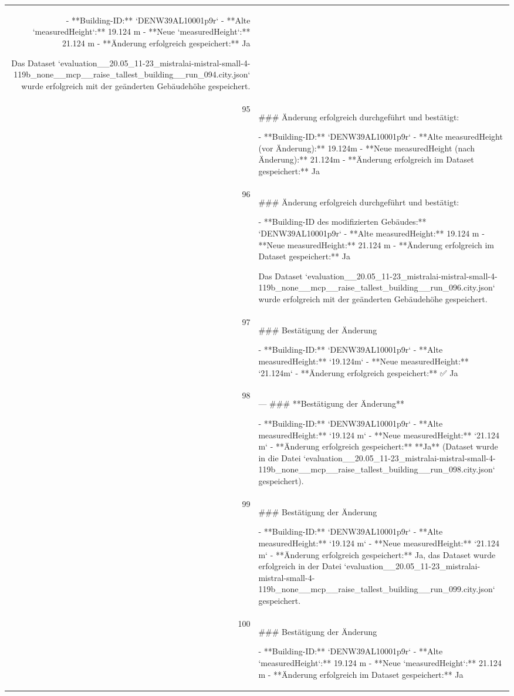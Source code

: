 \documentclass[a4paper,11pt]{article}
\begin{document}
\begin{table}[ht]
\begin{tabular}{r p{12cm}}
- **Building-ID:** `DENW39AL10001p9r`
- **Alte `measuredHeight`:** 19.124 m
- **Neue `measuredHeight`:** 21.124 m
- **Änderung erfolgreich gespeichert:** Ja

Das Dataset `evaluation\_\_20.05\_11-23\_mistralai-mistral-small-4-119b\_none\_\_mcp\_\_raise\_tallest\_building\_\_run\_094.city.json` wurde erfolgreich mit der geänderten Gebäudehöhe gespeichert. \\
95 & \#\#\# Änderung erfolgreich durchgeführt und bestätigt:

- **Building-ID:** `DENW39AL10001p9r`
- **Alte measuredHeight (vor Änderung):** 19.124m
- **Neue measuredHeight (nach Änderung):** 21.124m
- **Änderung erfolgreich im Dataset gespeichert:** Ja \\
96 & \#\#\# Änderung erfolgreich durchgeführt und bestätigt:

- **Building-ID des modifizierten Gebäudes:** `DENW39AL10001p9r`
- **Alte measuredHeight:** 19.124 m
- **Neue measuredHeight:** 21.124 m
- **Änderung erfolgreich im Dataset gespeichert:** Ja

Das Dataset `evaluation\_\_20.05\_11-23\_mistralai-mistral-small-4-119b\_none\_\_mcp\_\_raise\_tallest\_building\_\_run\_096.city.json` wurde erfolgreich mit der geänderten Gebäudehöhe gespeichert. \\
97 & \#\#\# Bestätigung der Änderung

- **Building-ID:** `DENW39AL10001p9r`
- **Alte measuredHeight:** `19.124m`
- **Neue measuredHeight:** `21.124m`
- **Änderung erfolgreich gespeichert:** ✅ Ja \\
98 & ---
\#\#\# **Bestätigung der Änderung**

- **Building-ID:** `DENW39AL10001p9r`
- **Alte measuredHeight:** `19.124 m`
- **Neue measuredHeight:** `21.124 m`
- **Änderung erfolgreich gespeichert:** **Ja**
  (Dataset wurde in die Datei `evaluation\_\_20.05\_11-23\_mistralai-mistral-small-4-119b\_none\_\_mcp\_\_raise\_tallest\_building\_\_run\_098.city.json` gespeichert). \\
99 & \#\#\# Bestätigung der Änderung

- **Building-ID:** `DENW39AL10001p9r`
- **Alte measuredHeight:** `19.124 m`
- **Neue measuredHeight:** `21.124 m`
- **Änderung erfolgreich gespeichert:** Ja, das Dataset wurde erfolgreich in der Datei `evaluation\_\_20.05\_11-23\_mistralai-mistral-small-4-119b\_none\_\_mcp\_\_raise\_tallest\_building\_\_run\_099.city.json` gespeichert. \\
100 & \#\#\# Bestätigung der Änderung

- **Building-ID:** `DENW39AL10001p9r`
- **Alte `measuredHeight`:** 19.124 m
- **Neue `measuredHeight`:** 21.124 m
- **Änderung erfolgreich im Dataset gespeichert:** Ja \\
\hline
\end{tabular}
\end{table}
\end{document}
